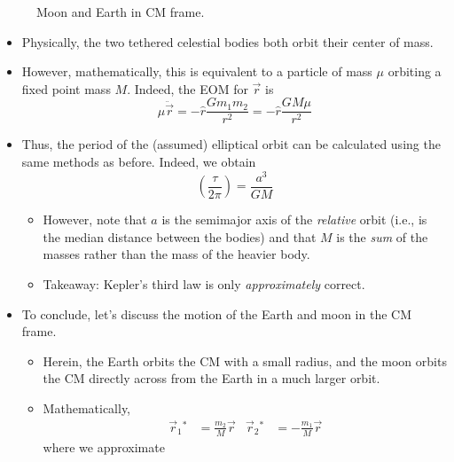 \documentclass[../notes.tex]{subfiles}
\begin{document}
\begin{itemize}
\begin{figure}[h!]
        \caption{Moon and Earth in CM frame.}
        \label{fig:CMmoonEarth}
    \end{figure}
    \begin{itemize}
        \item Physically, the two tethered celestial bodies both orbit their center of mass.
        \item However, mathematically, this is equivalent to a particle of mass $\mu$ orbiting a fixed point mass $M$. Indeed, the EOM for $\vec{r}$ is
        \begin{equation*}
            \mu\ddot{\vec{r}} = -\hat{r}\frac{Gm_1m_2}{r^2}
            = -\hat{r}\frac{GM\mu}{r^2}
        \end{equation*}
        \item Thus, the period of the (assumed) elliptical orbit can be calculated using the same methods as before. Indeed, we obtain
        \begin{equation*}
            \left( \frac{\tau}{2\pi} \right) = \frac{a^3}{GM}
        \end{equation*}
        \begin{itemize}
            \item However, note that $a$ is the semimajor axis of the \emph{relative} orbit (i.e., is the median distance between the bodies) and that $M$ is the \emph{sum} of the masses rather than the mass of the heavier body.
            \item Takeaway: Kepler's third law is only \emph{approximately} correct.
        \end{itemize}
        \item To conclude, let's discuss the motion of the Earth and moon in the CM frame.
        \begin{itemize}
            \item Herein, the Earth orbits the CM with a small radius, and the moon orbits the CM directly across from the Earth in a much larger orbit.
            \item Mathematically,
            \begin{align*}
                \vec{r}_1{}^* &= \frac{m_2}{M}\vec{r}&
                \vec{r}_2{}^* &= -\frac{m_1}{M}\vec{r}
            \end{align*}
            where we approximate

\end{itemize}
\end{itemize}
\end{itemize}
\end{document}

